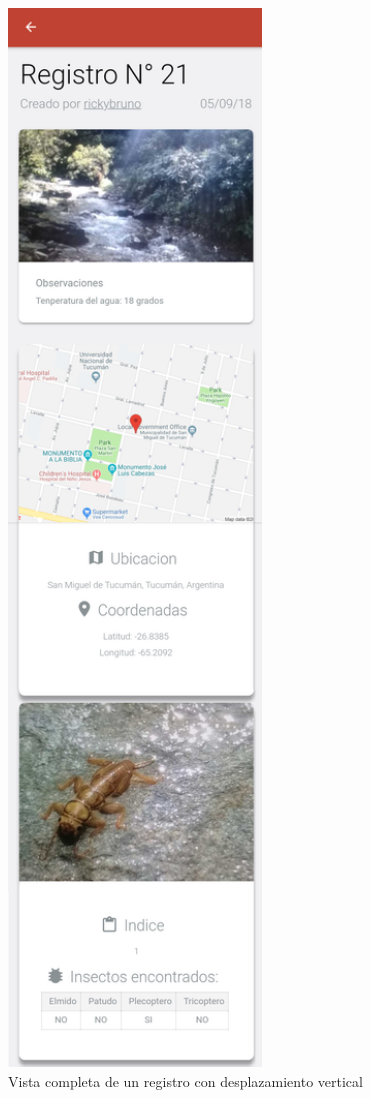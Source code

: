 \begin{itemize}
					\begin{figure}
						\centering
							\includegraphics[width=0.6\textwidth]{Screenshots/verRegistroCompleto.png}
									\caption{Vista completa de un registro con desplazamiento vertical}
							\label{fig:verRegistroCompleto}
					\end{figure}



\end{itemize}
